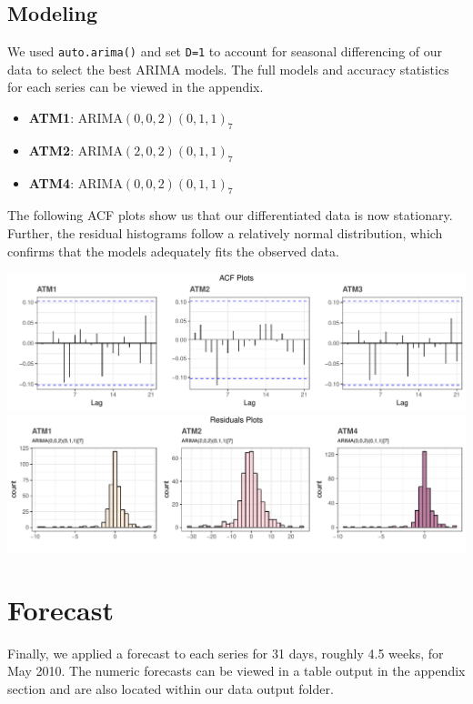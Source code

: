 \documentclass[openany]{book}
\providecommand{\tightlist}{%
  \setlength{\itemsep}{0pt}\setlength{\parskip}{0pt}}
\begin{document}
\hypertarget{modeling}{%
\subsection{Modeling}\label{modeling}}

We used \texttt{auto.arima()} and set \texttt{D=1} to account for
seasonal differencing of our data to select the best ARIMA models. The
full models and accuracy statistics for each series can be viewed in the
appendix.

\begin{itemize}
\tightlist
\item
  \textbf{ATM1}: ARIMA\((0,0,2)(0,1,1)_7\)
\item
  \textbf{ATM2}: ARIMA\((2,0,2)(0,1,1)_7\)
\item
  \textbf{ATM4}: ARIMA\((0,0,2)(0,1,1)_7\)
\end{itemize}

The following ACF plots show us that our differentiated data is now
stationary. Further, the residual histograms follow a relatively normal
distribution, which confirms that the models adequately fits the
observed data.

\includegraphics{Part-A-JM_files/figure-latex/unnamed-chunk-6-1.pdf}
\includegraphics{Part-A-JM_files/figure-latex/unnamed-chunk-6-2.pdf}

\hypertarget{forecast}{%
\section{Forecast}\label{forecast}}

Finally, we applied a forecast to each series for 31 days, roughly 4.5
weeks, for May 2010. The numeric forecasts can be viewed in a table
output in the appendix section and are also located within our data
output folder.
\end{document}
